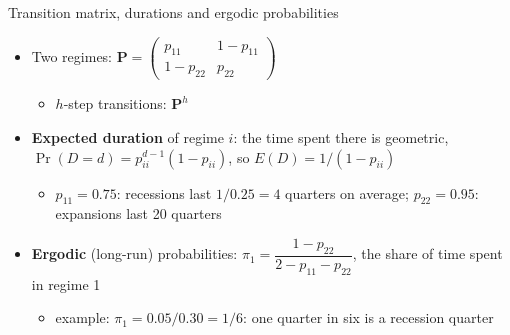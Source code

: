 \begin{frame}{Transition matrix, durations and ergodic probabilities}
\itemsize{\small}
\begin{itemize}
    \item Two regimes: $\mathbf{P} = \begin{pmatrix}p_{11} & 1 - p_{11}\\ 1 - p_{22} & p_{22}\end{pmatrix}$
    \begin{itemize}
        \item $h$-step transitions: $\mathbf{P}^h$
    \end{itemize}
    \item \textbf{Expected duration} of regime $i$: the time spent there is geometric, $\Pr(D = d) = p_{ii}^{d-1}(1 - p_{ii})$, so $E(D) = 1/(1 - p_{ii})$
    \begin{itemize}
        \item $p_{11} = 0.75$: recessions last $1/0.25 = 4$ quarters on average; $p_{22} = 0.95$: expansions last 20 quarters
    \end{itemize}
    \item \textbf{Ergodic} (long-run) probabilities: $\pi_1 = \dfrac{1 - p_{22}}{2 - p_{11} - p_{22}}$, the share of time spent in regime 1
    \begin{itemize}
        \item example: $\pi_1 = 0.05/0.30 = 1/6$: one quarter in six is a recession quarter
    \end{itemize}
\end{itemize}
\end{frame}

